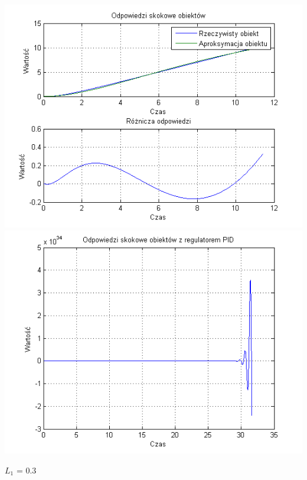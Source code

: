 \documentclass[10pt,a4paper]{article}
\begin{document}
\begin{center}
\includegraphics[scale=1]{images/dwa/skrypt_141.png}\\
\includegraphics[scale=1]{images/dwa/skrypt_142.png}\\
\end{center}
\newpage
$L_1$ = 0.3
\end{document}
